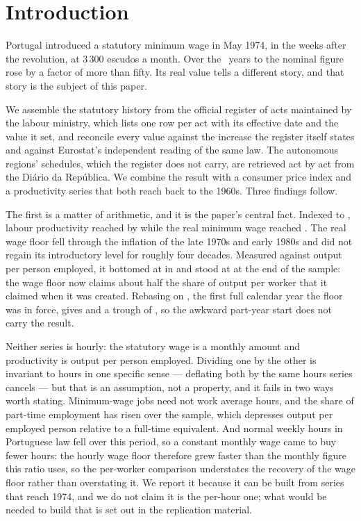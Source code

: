 \section{Introduction}
\label{sec:introduction}

Portugal introduced a statutory minimum wage in May 1974, in the weeks after
the revolution, at 3\,300 escudos a month. Over the
\ObservedYears{}~years to \MacroLastYear{} the nominal figure rose by a factor
of more than fifty. Its real value tells a different story, and that story is
the subject of this paper.

We assemble the statutory history from the official register of acts maintained
by the labour ministry, which lists one row per act with its effective date and
the value it set, and reconcile every value against the increase the register
itself states and against Eurostat's independent reading of the same law. The
autonomous regions' schedules, which the register does not carry, are retrieved
act by act from the Diário da República. We combine the result with a consumer
price index and a productivity series that both reach back to the 1960s. Three
findings follow.

The first is a matter of arithmetic, and it is the paper's central fact. Indexed
to \MacroFirstYear{}, labour productivity reached \ProductivityIndexEnd{} by
\MacroLastYear{} while the real minimum wage reached \RealWageIndexEnd{}. The
real wage floor fell through the inflation of the late 1970s and early 1980s and
did not regain its introductory level for roughly four decades. Measured against
output per person employed, it bottomed at \WageToProductivityMin{} in
\WageToProductivityMinYear{} and stood at \WageToProductivityEnd{} at the end of
the sample: the wage floor now claims about half the share of output per worker
that it claimed when it was created. Rebasing on \MacroSecondYear{}, the first
full calendar year the floor was in force, gives \WageToProductivityEndAlt{} and
a trough of \WageToProductivityMinAlt{}, so the awkward part-year start does not
carry the result.

Neither series is hourly: the statutory wage is a monthly amount and
productivity is output per person employed. Dividing one by the other is
invariant to hours in one specific sense --- deflating both by the same hours
series cancels --- but that is an assumption, not a property, and it fails in two
ways worth stating. Minimum-wage jobs need not work average hours, and the share
of part-time employment has risen over the sample, which depresses output per
employed person relative to a full-time equivalent. And normal weekly hours in
Portuguese law fell over this period, so a constant monthly wage came to buy
fewer hours: the hourly wage floor therefore grew faster than the monthly figure
this ratio uses, so the per-worker comparison understates the recovery of the
wage floor rather than overstating it. We report it because it can be built from
series that reach 1974, and we do not claim it is the per-hour one; what would
be needed to build that is set out in the replication material.

